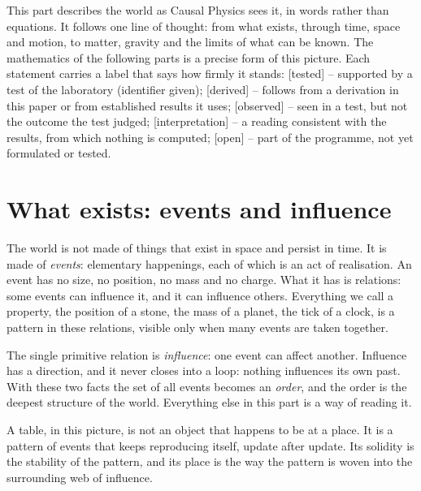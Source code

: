 
This part describes the world as Causal Physics sees it, in words rather than equations. It follows
one line of thought: from what exists, through time, space and motion, to matter, gravity and the
limits of what can be known. The mathematics of the following parts is a precise form of this
picture. Each statement carries a label that says how firmly it stands:
\textsf{[tested]} -- supported by a test of the laboratory (identifier given);
\textsf{[derived]} -- follows from a derivation in this paper or from established results it uses;
\textsf{[observed]} -- seen in a test, but not the outcome the test judged;
\textsf{[interpretation]} -- a reading consistent with the results, from which nothing is computed;
\textsf{[open]} -- part of the programme, not yet formulated or tested.

\section{What exists: events and influence}\label{sec:onto-events}

The world is not made of things that exist in space and persist in time. It is made of
\emph{events}: elementary happenings, each of which is an act of realisation. An event has no size,
no position, no mass and no charge. What it has is relations: some events can influence it, and it
can influence others. Everything we call a property, the position of a stone, the mass of a planet,
the tick of a clock, is a pattern in these relations, visible only when many events are taken
together. 

The single primitive relation is \emph{influence}: one event can affect another. Influence has a
direction, and it never closes into a loop: nothing influences its own past. With these two facts
the set of all events becomes an \emph{order}, and the order is the deepest structure of the world.
Everything else in this part is a way of reading it. 

A table, in this picture, is not an object that happens to be at a place. It is a pattern of events
that keeps reproducing itself, update after update. Its solidity is the stability of the pattern,
and its place is the way the pattern is woven into the surrounding web of influence.

